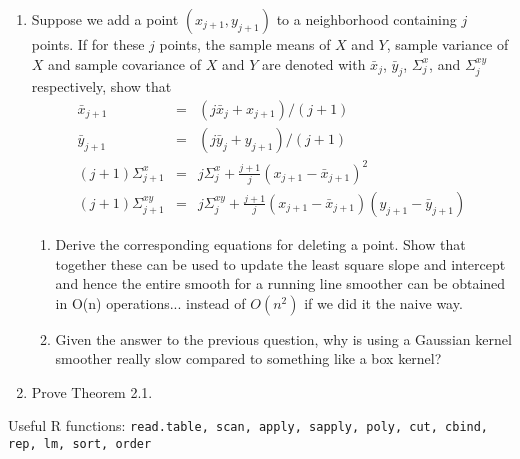 \documentclass[12pt]{article}
\begin{document}
\begin{enumerate}
\item Suppose we add a point $(x_{j+1},y_{j+1})$
  to a neighborhood containing $j$ points. If for these $j$ points,
  the sample means of $X$ and  $Y$, sample variance of $X$ and sample
  covariance of $X$ and $Y$ are denoted with $\bar{x}_j$, $\bar{y}_j$,
  $\Sigma^x_j$, and $\Sigma^{xy}_j$ respectively, show that 
\begin{eqnarray*}
\bar{x}_{j+1} &=& (j\bar{x}_j + x_{j+1})/(j+1)\\
\bar{y}_{j+1} &=& (j\bar{y}_j + y_{j+1})/(j+1)\\
(j+1) \Sigma^x_{j+1} &=& j   \Sigma^x_{j} + \frac{j+1}{j} (x_{j+1} -
\bar{x}_{j+1})^2\\
(j+1)\Sigma^{xy}_{j+1} &=&  j   \Sigma^{xy}_{j} + \frac{j+1}{j}  (x_{j+1} -
\bar{x}_{j+1}) (y_{j+1} -
\bar{y}_{j+1})
\end{eqnarray*}
\begin{enumerate}
\item Derive the corresponding equations for deleting a point. Show that
  together these can be used to update the least square slope and
  intercept and hence the entire smooth for a running line smoother
  can be obtained in O(n) operations... instead of $O(n^2)$ if we did
  it the naive way. 
  
\item Given the answer to the previous question, why is using a
  Gaussian kernel 
  smoother really slow compared to something like a box kernel?

\end{enumerate}

\item Prove Theorem 2.1.

\end{enumerate}
\noindent Useful R functions: 
{\tt read.table, scan, apply, sapply, poly, cut, cbind, rep, lm, sort, order}
\end{document}
